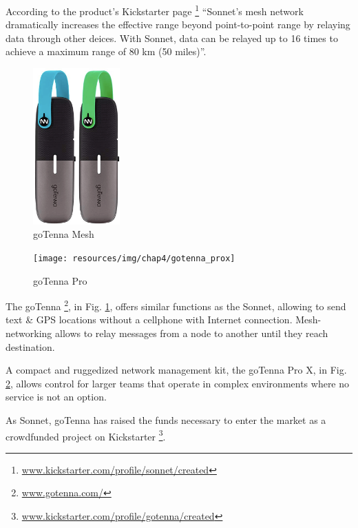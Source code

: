 				According to the product's Kickstarter page \footnote{ \url{www.kickstarter.com/profile/sonnet/created}} ``Sonnet's mesh network dramatically increases the effective range beyond point-to-point range by relaying data through other deices. With Sonnet, data can be relayed up to 16 times to achieve a maximum range of 80 km (50 miles)''.

				\begin{minipage}{0.5\textwidth}%
					\begin{figure}[H]
						\centering
						\includegraphics[height=6cm]{resources/img/chap4/gotenna}
						\caption{goTenna Mesh}
						\label{img:gotenna}
					\end{figure}
				\end{minipage}%
				\hfill%
				\begin{minipage}{0.5\textwidth}\raggedright
					\begin{figure}[H]
						\centering
						\texttt{[image: resources/img/chap4/gotenna\_prox]}
						\caption{goTenna Pro}
						\label{img:gotenna_pro}
					\end{figure}
				\end{minipage}%
				\newline
				
				The goTenna \footnote{ \url{www.gotenna.com/}}, in Fig. \ref{img:gotenna}, offers similar functions as the Sonnet, allowing to send text \& GPS locations without a cellphone with Internet connection.
				Mesh-networking allows to relay messages from a node to another until they reach destination.
				
				A compact and ruggedized network management kit, the goTenna Pro X, in Fig. \ref{img:gotenna_pro}, allows control for larger teams that operate in complex environments where no service is not an option.
						
				As Sonnet, goTenna has raised the funds necessary to enter the market as a crowdfunded project on Kickstarter \footnote{\url{www.kickstarter.com/profile/gotenna/created}}.
				
